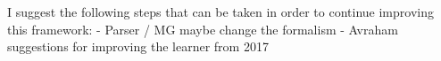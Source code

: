 \documentclass{article}
\begin{document}
I suggest the following steps that can be taken in order to continue improving this framework:
- Parser / MG maybe change the formalism
- Avraham suggestions for improving the learner from 2017 %


\clearpage
\fancyhead{} %
\end{document}
